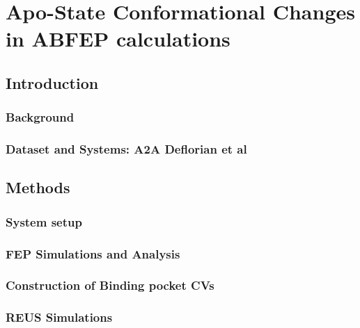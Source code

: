 \chapter{Apo-State Conformational Changes in ABFEP calculations}
\label{ch:apo-state-conformational-changes}
\section{Introduction}

\lipsum[1][1-3]

\subsection{Background}

\lipsum[1][1-3]

\subsection{Dataset and Systems: A2A Deflorian et al}

\lipsum[1][1-3]

\section{Methods}

\lipsum[1][1-3]

\subsection{System setup}

\lipsum[1][1-3]

\subsection{FEP Simulations and Analysis}

\lipsum[1][1-3]

\subsection{Construction of Binding pocket CVs}

\lipsum[1][1-3]

\subsection{REUS Simulations}

\lipsum[1][1-3]

